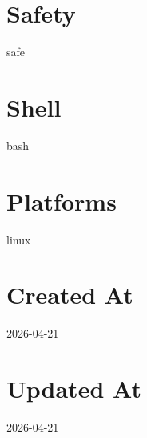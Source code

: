 \documentclass{article}
\begin{document}
\section*{Safety}
safe

\section*{Shell}
bash

\section*{Platforms}
linux

\section*{Created At}
2026-04-21

\section*{Updated At}
2026-04-21
\end{document}
